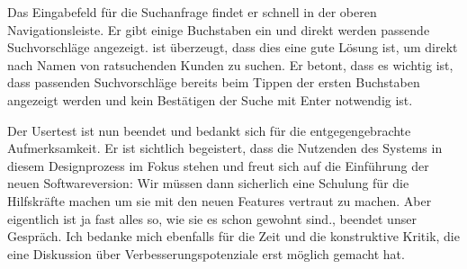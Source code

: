 Das Eingabefeld für die Suchanfrage findet er schnell in der oberen
Navigationsleiste. Er gibt einige Buchstaben ein und direkt werden passende
Suchvorschläge angezeigt. \ipName ist überzeugt, dass dies eine gute Lösung
ist, um direkt nach Namen von ratsuchenden Kunden zu suchen. Er betont, dass es
wichtig ist, dass passenden Suchvorschläge bereits beim Tippen der ersten
Buchstaben angezeigt werden und kein Bestätigen der Suche mit Enter notwendig
ist.

Der Usertest ist nun beendet und \ipName bedankt sich für die entgegengebrachte
Aufmerksamkeit. Er ist sichtlich begeistert, dass die Nutzenden des Systems in
diesem Designprozess im Fokus stehen und freut sich auf die Einführung der
neuen Softwareversion: \glqq{}Wir müssen dann sicherlich eine Schulung für die
Hilfskräfte machen um sie mit den neuen Features vertraut zu machen. Aber
eigentlich ist ja fast alles so, wie sie es schon gewohnt sind.\grqq{}, beendet
\ipName unser Gespräch\cite{clavesUsertest}. Ich bedanke mich ebenfalls für die Zeit und die
konstruktive Kritik, die eine Diskussion über Verbesserungspotenziale erst
möglich gemacht hat.